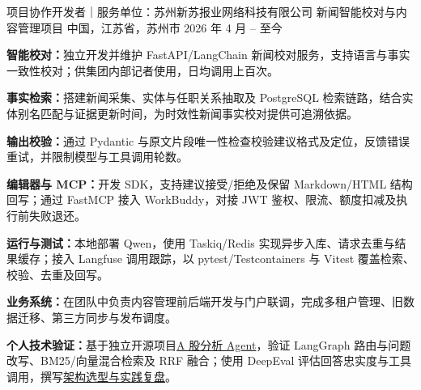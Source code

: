 

\begin{cventries}
\cventry
  {项目协作开发者｜服务单位：苏州新苏报业网络科技有限公司}
  {新闻智能校对与内容管理项目}
  {中国，江苏省，苏州市}
  {2026 年 4 月 -- 至今}
  {
    \begin{cvitems}
      \item {\textbf{智能校对：}独立开发并维护 FastAPI/LangChain 新闻校对服务，支持语言与事实一致性校对；供集团内部记者使用，日均调用上百次。}
      \item {\textbf{事实检索：}搭建新闻采集、实体与任职关系抽取及 PostgreSQL 检索链路，结合实体别名匹配与证据更新时间，为时效性新闻事实校对提供可追溯依据。}
      \item {\textbf{输出校验：}通过 Pydantic 与原文片段唯一性检查校验建议格式及定位，反馈错误重试，并限制模型与工具调用轮数。}
      \item {\textbf{编辑器与 MCP：}开发 SDK，支持建议接受/拒绝及保留 Markdown/HTML 结构回写；通过 FastMCP 接入 WorkBuddy，对接 JWT 鉴权、限流、额度扣减及执行前失败退还。}
      \item {\textbf{运行与测试：}本地部署 Qwen，使用 Taskiq/Redis 实现异步入库、请求去重与结果缓存；接入 Langfuse 调用跟踪，以 pytest/Testcontainers 与 Vitest 覆盖检索、校验、去重及回写。}
      \item {\textbf{业务系统：}在团队中负责内容管理前后端开发与门户联调，完成多租户管理、旧数据迁移、第三方同步与发布调度。}
      \item {\textbf{个人技术验证：}基于独立开源项目\href{https://github.com/FreeFlyingSheep/stock-analysis}{A 股分析 Agent}，验证 LangGraph 路由与问题改写、BM25/向量混合检索及 RRF 融合；使用 DeepEval 评估回答忠实度与工具调用，撰写\href{https://freeflyingsheep.github.io/posts/ai/agent/demo/}{架构选型与实践复盘}。}
    \end{cvitems}
  }


\end{cventries}
